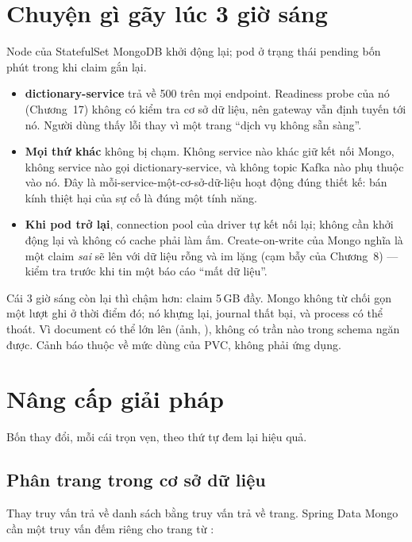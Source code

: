 \section{Chuyện gì gãy lúc 3 giờ sáng}

Node của StatefulSet MongoDB khởi động lại; pod ở trạng thái pending
bốn phút trong khi claim gắn lại.

\begin{itemize}
  \item \textbf{dictionary-service} trả về 500 trên mọi endpoint.
  Readiness probe của nó (Chương~17) không có kiểm tra cơ sở dữ liệu,
  nên gateway vẫn định tuyến tới nó. Người dùng thấy lỗi thay vì một
  trang ``dịch vụ không sẵn sàng''.
  \item \textbf{Mọi thứ khác} không bị chạm. Không service nào khác giữ
  kết nối Mongo, không service nào gọi dictionary-service, và không
  topic Kafka nào phụ thuộc vào nó. Đây là mỗi-service-một-cơ-sở-dữ-liệu
  hoạt động đúng thiết kế: bán kính thiệt hại của sự cố là đúng một
  tính năng.
  \item \textbf{Khi pod trở lại}, connection pool của driver tự kết nối
  lại; không cần khởi động lại và không có cache phải làm ấm.
  Create-on-write của Mongo nghĩa là một claim \emph{sai} sẽ lên với dữ
  liệu rỗng và im lặng (cạm bẫy của Chương~8) --- kiểm tra
   trước khi tin một báo cáo ``mất dữ liệu''.
\end{itemize}

Cái 3 giờ sáng còn lại thì chậm hơn: claim 5\,GB đầy. Mongo không từ
chối gọn một lượt ghi ở thời điểm đó; nó khựng lại, journal thất bại,
và process có thể thoát. Vì document có thể lớn lên (ảnh, ),
không có trần nào trong schema ngăn được. Cảnh báo thuộc về mức dùng của
PVC, không phải ứng dụng.

\section{Nâng cấp giải pháp}

Bốn thay đổi, mỗi cái trọn vẹn, theo thứ tự đem lại hiệu quả.

\subsection{Phân trang trong cơ sở dữ liệu}

Thay truy vấn trả về danh sách bằng truy vấn trả về trang. Spring Data
Mongo cần một truy vấn đếm riêng cho trang từ :

